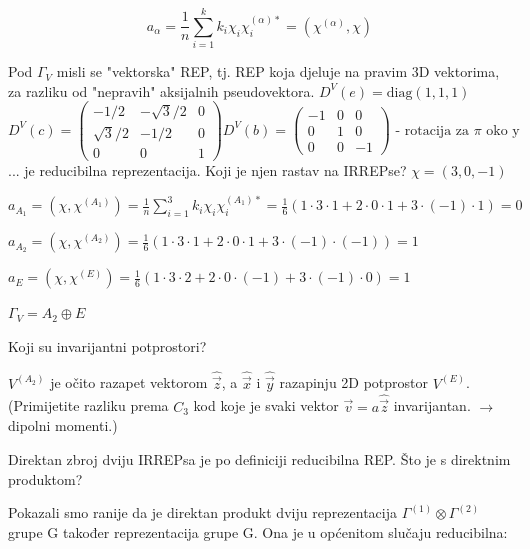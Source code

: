 \begin{displaymath}
a_{\alpha} = \frac{1}{n} \sum_{i=1}^{k}  k_i \chi_i \chi^{(\alpha)*}_i
= (\chi^{(\alpha)}, \chi)
\end{displaymath}

\begin{primjer}
Pod $\Gamma_V$ misli se "vektorska" REP, tj. REP koja djeluje
na pravim 3D vektorima, za razliku od "nepravih" aksijalnih pseudovektora.
$D^{V}(e)=\textrm{diag}(1,1,1)$
\begin{displaymath}
D^{V}(c)=\left(
\begin{array}{ccc}
-1/2 & -\sqrt{3}/2 & 0 \\
\sqrt{3}/2 & -1/2 & 0 \\
0 & 0 & 1
\end{array}\right)
D^{V}(b)=\left(
\begin{array}{ccc}
-1 & 0 & 0 \\
0 & 1 & 0 \\
0 & 0 & -1
\end{array}\right) \textrm{ - rotacija za $\pi$ oko y}
\end{displaymath}
... je reducibilna reprezentacija. Koji je njen rastav na IRREPse?
$\chi=(3,0,-1)$

$a_{A_1} = (\chi, \chi^{(A_1)})=\frac{1}{n}\sum_{i=1}^{3} k_i \chi_i \chi^{(A_1)*}_i
 = \frac{1}{6}(1\cdot 3\cdot 1 + 2\cdot 0\cdot 1 + 3\cdot (-1) \cdot 1)=0$

$a_{A_2} = (\chi, \chi^{(A_2)})
=\frac{1}{6}(1\cdot 3\cdot 1 + 2\cdot 0\cdot 1 + 3\cdot (-1)\cdot(-1))=1$

$a_{E} = (\chi, \chi^{(E)})
=\frac{1}{6}(1\cdot 3\cdot 2 + 2\cdot 0\cdot (-1) + 3\cdot (-1)\cdot 0)=1$

$\Gamma_V  = A_2 \oplus E $

Koji su invarijantni potprostori?

$V^{(A_2)}$ je očito razapet vektorom $\hat{\vec{z}}$, a $\hat{\vec{x}}$ i
$\hat{\vec{y}}$ razapinju 2D potprostor $V^{(E)}$. (Primijetite razliku
prema $C_3$ kod koje je svaki vektor $\vec{v}=a\hat{\vec{z}}$ invarijantan.
$\to$ dipolni momenti.)
\end{primjer}


Direktan zbroj dviju IRREPsa je po definiciji reducibilna REP.
Što je s direktnim produktom?

Pokazali smo ranije da je direktan produkt dviju reprezentacija
$\Gamma^{(1)} \otimes \Gamma^{(2)}$ grupe G također reprezentacija
grupe G. Ona je u općenitom slučaju reducibilna:

